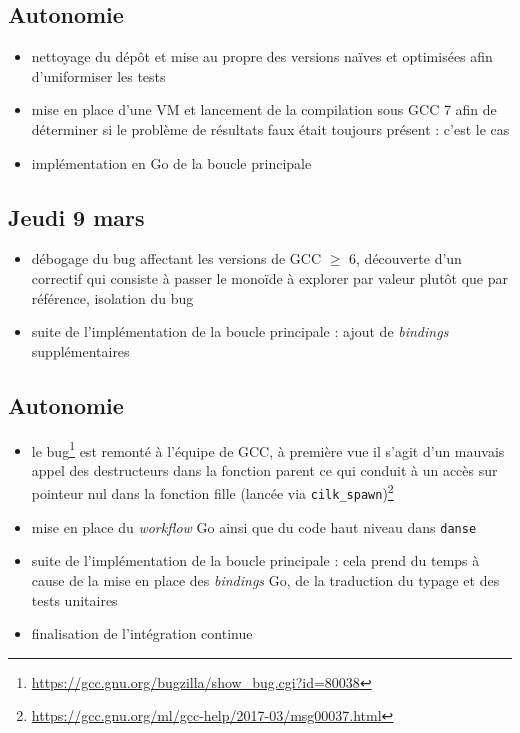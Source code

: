\documentclass[12pt,a4paper]{article}
\let\geq\geqslant
\begin{document}
\subsection*{Autonomie}
\begin{itemize}
	\item	nettoyage du dépôt et mise au propre des versions naïves et optimisées afin d'uniformiser les tests
	\item	mise en place d'une VM et lancement de la compilation sous GCC 7 afin de déterminer si le problème de résultats faux était toujours présent : c'est le cas
	\item	implémentation en Go de la boucle principale
\end{itemize}

\subsection*{Jeudi 9 mars}
\begin{itemize}
	\item	débogage du bug affectant les versions de GCC $\geq$ 6, découverte d'un correctif qui consiste à passer le monoïde à explorer par valeur plutôt que par référence, isolation du bug
	\item	suite de l'implémentation de la boucle principale : ajout de \emph{bindings} supplémentaires
\end{itemize}

\subsection*{Autonomie}
\begin{itemize}
	\item	le bug\footnote{\url{https://gcc.gnu.org/bugzilla/show_bug.cgi?id=80038}} est remonté à l'équipe de GCC, à première vue il s'agit d'un mauvais appel des destructeurs dans la fonction parent ce qui conduit à un accès sur pointeur nul dans la fonction fille (lancée via \texttt{cilk\_spawn})\footnote{\url{https://gcc.gnu.org/ml/gcc-help/2017-03/msg00037.html}}
	\item	mise en place du \emph{workflow} Go ainsi que du code haut niveau dans \texttt{danse}
	\item	suite de l'implémentation de la boucle principale : cela prend du temps à cause de la mise en place des \emph{bindings} Go, de la traduction du typage et des tests unitaires
	\item	finalisation de l'intégration continue
\end{itemize}
\end{document}
